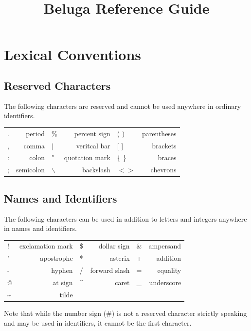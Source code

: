 \documentclass[11pt]{article}
\begin{document}
\title{Beluga Reference Guide}
\author{}
\date{}
\maketitle

\tableofcontents

\newpage

\section{Lexical Conventions}
\subsection{Reserved Characters}
The following characters are reserved and cannot be used anywhere in ordinary identifiers.
\begin{center}
\begin{tabular}{ | l r | l r | l r }
  . & period & \% & percent sign &  ( )  & parentheses \\
 , & comma & $\vert$ & veritcal bar & [ ] & brackets\\
: & colon &  " & quotation mark  & \{ \} & braces  \\ 
; & semicolon & $\backslash$ & backslash  & $< >$ & chevrons  \\
\end{tabular}
\end{center}

\subsection{Names and Identifiers}
The following characters can be used in addition to letters and integers anywhere in names and identifiers.
\begin{center}
\begin{tabular}{ | l r | l r | l r }
 ! & exclamation mark & \$ & dollar sign & \& & ampersand\\
' & apostrophe &  * & asterix  & + & addition \\ 
- & hyphen & / & forward slash  & = & equality  \\
@ & at sign & \^{} & caret  &  \_  & underscore  \\
\~{} & tilde &\\
\end{tabular}
\end{center}
Note that while the number sign (\#) is not a reserved  character strictly speaking and may be used in identifiers, it cannot be the first character.  
\end{document}
